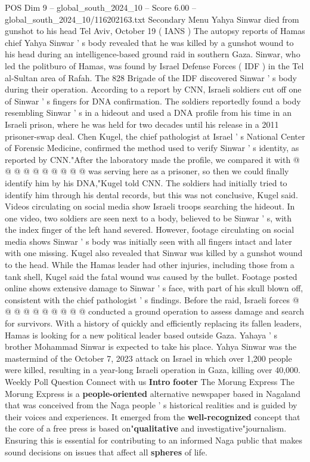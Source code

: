 \begin{textsample}{POS Dim 9 – global\_south\_2024\_10 – Score 6.00 – global\_south\_2024\_10/116202163.txt}  \label{ex:f9_pos_087}
Secondary Menu Yahya Sinwar died from gunshot to his head Tel Aviv, October 19 ( IANS ) The autopsy reports of Hamas chief Yahya Sinwar ' s body revealed that he was killed by a gunshot wound to his head during an intelligence-based ground raid in southern Gaza.
Sinwar, who led the politburo of Hamas, was found by Israel Defense Forces ( IDF ) in the Tel al-Sultan area of Rafah.
The 828 Brigade of the IDF discovered Sinwar ' s body during their operation.
According to a report by CNN, Israeli soldiers cut off one of Sinwar ' s fingers for DNA confirmation.
The soldiers reportedly found a body resembling Sinwar ' s in a hideout and used a DNA profile from his time in an Israeli prison, where he was held for two decades until his release in a 2011 prisoner-swap deal.
Chen Kugel, the chief pathologist at Israel ' s National Center of Forensic Medicine, confirmed the method used to verify Sinwar ' s identity, as reported by CNN."After the laboratory made the profile, we compared it with @ @ @ @ @ @ @ @ @ @ was serving here as a prisoner, so then we could finally identify him by his DNA,"Kugel told CNN.
The soldiers had initially tried to identify him through his dental records, but this was not conclusive, Kugel said.
Videos circulating on social media show Israeli troops searching the hideout.
In one video, two soldiers are seen next to a body, believed to be Sinwar ' s, with the index finger of the left hand severed.
However, footage circulating on social media shows Sinwar ' s body was initially seen with all fingers intact and later with one missing.
Kugel also revealed that Sinwar was killed by a gunshot wound to the head.
While the Hamas leader had other injuries, including those from a tank shell, Kugel said the fatal wound was caused by the bullet.
Footage posted online shows extensive damage to Sinwar ' s face, with part of his skull blown off, consistent with the chief pathologist ' s findings.
Before the raid, Israeli forces @ @ @ @ @ @ @ @ @ @ conducted a ground operation to assess damage and search for survivors.
With a history of quickly and efficiently replacing its fallen leaders, Hamas is looking for a new political leader based outside Gaza.
Yahaya ' s brother Mohammad Sinwar is expected to take his place.
Yahya Sinwar was the mastermind of the October 7, 2023 attack on Israel in which over 1,200 people were killed, resulting in a year-long Israeli operation in Gaza, killing over 40,000.
Weekly Poll Question Connect with us \textbf{Intro} \textbf{footer} The Morung Express The Morung Express is a \textbf{people-oriented} alternative newspaper based in Nagaland that was conceived from the Naga people ' s historical realities and is guided by their voices and experiences.
It emerged from the \textbf{well-recognized} concept that the core of a free press is based on"\textbf{qualitative} and investigative"journalism.
Ensuring this is essential for contributing to an informed Naga public that makes sound decisions on issues that affect all \textbf{spheres} of life.

\end{textsample}
